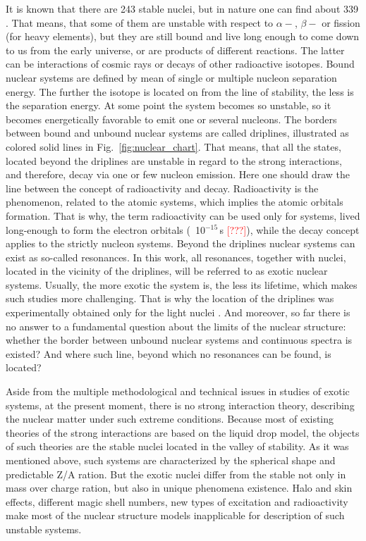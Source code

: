 It is known that there are 243 stable nuclei, but in nature one can find about 339 \cite{Grigorenko:2016}. 
That means, that some of them are unstable with respect to $\alpha-$, $\beta-$ or fission (for heavy elements), but they are still bound and live long enough to come down to us from the early universe, or are products of different reactions.
The latter can be interactions of cosmic rays or decays of other radioactive isotopes.
Bound nuclear systems are defined by mean of single or multiple nucleon separation energy.
The further the isotope is located on from the line of stability, the less is the separation energy.
At some point the system becomes so unstable, so it becomes energetically favorable to emit one or several nucleons.
The borders between bound and unbound nuclear systems are called driplines, illustrated as colored solid lines in Fig.\ \ref{fig:nuclear_chart}.
That means, that all the states, located beyond the driplines are unstable in regard to the strong interactions, and therefore, decay via one or few nucleon emission.
Here one should draw the line between the concept of radioactivity and decay. 
Radioactivity is the phenomenon, related to the atomic systems, which implies the atomic orbitals formation.
That is why, the term radioactivity can be used only for systems, lived long-enough to form the electron orbitals (~10$^{-15}$\,s \textcolor{red}{[???]}), while the decay concept applies to the strictly nucleon systems.
Beyond the driplines nuclear systems can exist as so-called resonances. 
In this work, all resonances, together with nuclei, located in the vicinity of the driplines, will be referred to as exotic nuclear systems.
Usually, the more exotic the system is, the less its lifetime, which makes such studies more challenging. 
That is why the location of the driplines was experimentally obtained only for the light nuclei \cite{GrigorenkoUFN:2019}.
And moreover, so far there is no answer to a fundamental question about the limits of the nuclear structure: whether the border between unbound nuclear systems and continuous spectra is existed? 
And where such line, beyond which no resonances can be found, is located?

Aside from the multiple methodological and technical issues in studies of exotic systems, at the present moment, there is no strong interaction theory, describing the nuclear matter under such extreme conditions.
Because most of existing theories of the strong interactions are based on the liquid drop model, the objects of such theories are the stable nuclei located in the valley of stability. 
As it was mentioned above, such systems are characterized by the spherical shape and predictable Z/A ration.
But the exotic nuclei differ from the stable not only in mass over charge ration, but also in unique phenomena existence.
Halo and skin effects, different magic shell numbers, new types of excitation and radioactivity make most of the nuclear structure models inapplicable for description of such unstable systems.

